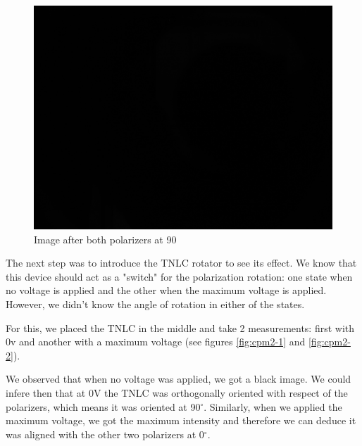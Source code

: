 \documentclass{article}
\begin{document}
\begin{figure}[ht]
\begin{minipage}[b]{0.3\linewidth}
  \label{fig:cpm1-2}
\end{minipage}
\quad
\begin{minipage}[b]{0.3\linewidth}
\includegraphics[width=1.0\textwidth,natwidth=100,natheight=100]{../CPM/im90.png}
  \caption{Image after both polarizers at 90}
  \label{fig:cpm1-3}
\end{minipage}
\end{figure}

The next step was to introduce the TNLC rotator to see its effect. 
We know that this device should act as a "switch" for the polarization
rotation: one state when no voltage is applied and the other when the maximum
voltage is applied. However, we didn't know the angle of rotation in either
of the states. 

For this, we placed the TNLC in the middle and take 2 measurements: first
with 0v and another with a maximum voltage (see figures \ref{fig:cpm2-1} and
\ref{fig:cpm2-2}).

We observed
that when no voltage was applied, we got a black image. We could infere then that
at 0V the TNLC was orthogonally oriented with respect of the polarizers, which means
it was oriented at 90$^\circ$. Similarly, when we applied the maximum
voltage, we got the maximum intensity and therefore we can deduce it was aligned
with the other two polarizers at 0$^\circ$.
\end{document}
